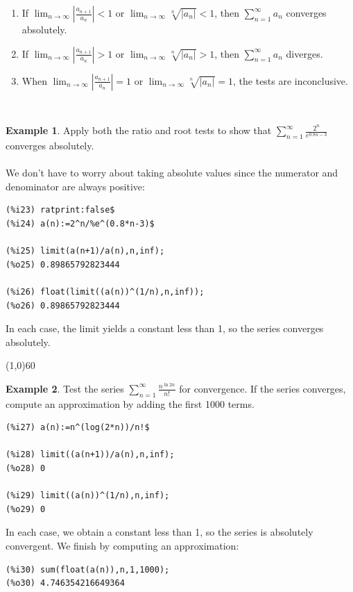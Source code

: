 \documentclass[10.5pt,twoside]{report}
\theoremstyle{definition}
\newtheorem{exmp}{Example}[section]
\begin{document}
\begin{enumerate}
\item If $\displaystyle \lim_{n\to \infty} \left| \frac{a_{n+1}}{a_n} \right|<1$ or $\displaystyle \lim_{n\to \infty} \sqrt[n]{|a_n|}<1$, then $\displaystyle \sum_{n=1}^{\infty} a_n$ converges absolutely.

\item If $\displaystyle \lim_{n\to \infty} \left| \frac{a_{n+1}}{a_n} \right|>1$ or $\displaystyle \lim_{n\to \infty} \sqrt[n]{|a_n|}>1$, then $\displaystyle \sum_{n=1}^{\infty} a_n$ diverges.


\item When $\displaystyle \lim_{n\to \infty} \left| \frac{a_{n+1}}{a_n} \right|=1$ or $\displaystyle \lim_{n\to \infty} \sqrt[n]{|a_n|}=1$, the tests are inconclusive.

\end{enumerate}

${}$\\

\begin{exmp} Apply both the ratio and root tests to show that $ \sum_{n=1}^{\infty} \frac{2^n}{e^{0.8n-3}}$ converges absolutely.\\

${}$\\

We don't have to worry about taking absolute values since the numerator and denominator are always positive:

\begin{verbatim}
(%i23) ratprint:false$
(%i24) a(n):=2^n/%e^(0.8*n-3)$

(%i25) limit(a(n+1)/a(n),n,inf);
(%o25) 0.89865792823444

(%i26) float(limit((a(n))^(1/n),n,inf));
(%o26) 0.89865792823444
\end{verbatim}


In each case, the limit yields a constant less than 1, so the series converges absolutely.

\end{exmp}

\line(1,0){60}
\linethickness{0.5mm}

\begin{exmp}  Test the series $ \sum_{n=1}^{\infty} \frac{n^{\ln{2n}}}{n!}$ for convergence.  If the series converges, compute an approximation by adding the first 1000 terms.

\begin{verbatim}
(%i27) a(n):=n^(log(2*n))/n!$

(%i28) limit((a(n+1))/a(n),n,inf);
(%o28) 0

(%i29) limit((a(n))^(1/n),n,inf);
(%o29) 0
\end{verbatim}

In each case, we obtain a constant less than 1, so the series is absolutely convergent.  We finish by computing an approximation:

\begin{verbatim}
(%i30) sum(float(a(n)),n,1,1000);
(%o30) 4.746354216649364
\end{verbatim}


\end{exmp}
\end{document}
